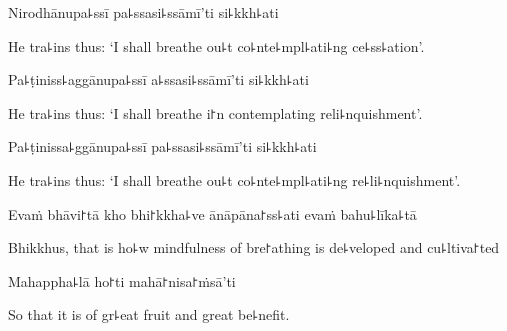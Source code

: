 Nirodhānupa꜕ssī pa꜕ssasi꜕ssāmī'ti si꜕kkh꜕ati

\begin{english}
  He tra꜕ins thus: `I shall breathe ou꜕t co꜕nte꜕mpl꜕ati꜕ng ce꜕ss꜕ation'.
\end{english}

Pa꜕ṭiniss꜕aggānupa꜕ssī a꜕ssasi꜕ssāmī'ti si꜕kkh꜕ati

\begin{english}
  He tra꜕ins thus: `I shall breathe i꜓n contemplating reli꜕nquishment'.
\end{english}

Pa꜕ṭinissa꜕ggānupa꜕ssī pa꜕ssasi꜕ssāmī'ti si꜕kkh꜕ati

\begin{english}
  He tra꜕ins thus: `I shall breathe ou꜕t co꜕nte꜕mpl꜕ati꜕ng re꜕li꜕nquishment'.
\end{english}

Evaṁ bhāvi꜓tā kho bhi꜓kkha꜕ve ānāpāna꜓ss꜕ati evaṁ bahu꜕līka꜕tā

\begin{english}
  Bhikkhus, that is ho꜕w mindfulness of bre꜓athing is de꜕veloped and cu꜕ltiva꜓ted
\end{english}

Mahappha꜕lā ho꜓ti mahā꜓nisa꜓ṁsā'ti

\begin{english}
  So that it is of gr꜕eat fruit and great be꜕nefit.
\end{english}


